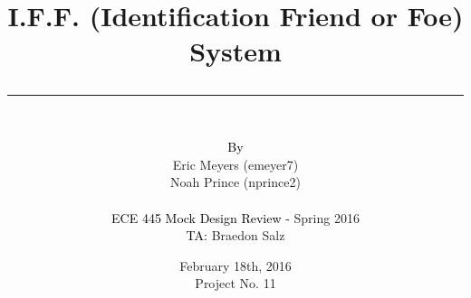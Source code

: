 \documentclass[openbib,letterpaper,10pt]{article}
\author{\vspace{.4in}\\
	\textcolor{black}{By}\\
	#1
	\vspace{1in}\\
	\textcolor{black}{ECE 445 Mock Design Review -} #2\\
	\textcolor{black}{TA:} #3
	\vspace{1in}}
\newcommand{\thetitle}[1]{\title{\begin{huge}{\bf #1}\end{huge} \color{subtitlecolor}\rule[25pt]{\textwidth}{1pt}}}
\newcommand{\theauthor}[3]{
	\author{\vspace{.4in}\\
	\textcolor{black}{By}\\
	#1
	\vspace{1in}\\
	\textcolor{black}{ECE 445 Mock Design Review -} #2\\
	\textcolor{black}{TA:} #3
	\vspace{1in}}
}
\begin{document}
\pagestyle{empty}
\doublespacing

\thetitle{{I.F.F. (Identification Friend or Foe) System}}

\theauthor{
	{Eric Meyers (emeyer7)}\\
	{Noah Prince (nprince2)}\\
}
{ %
	{Spring 2016}
}
{ %
	{Braedon Salz}
}

\date{
{February 18th, 2016}\\
Project No. 11
\clearpage
}
\end{document}

